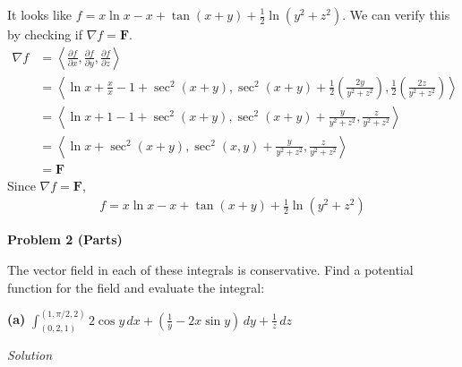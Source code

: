\documentclass{article}
\newcommand{\lrp}[1]{\left( #1 \right)}
\newcommand{\lra}[1]{\left\langle #1 \right\rangle}
\newcommand{\F}[0]{\mathbf{F}}
\newcommand{\Solution}{\textit{Solution}}
\begin{document}
It looks like $f= x\ln x - x+\tan (x+y) + \frac{1}{2}\ln \left(y^2+z^2\right)$. We can verify this by checking if $\nabla f=\F$.
\begin{align*}
    \nabla f &=\lra{\frac{\partial f}{\partial x}, \frac{\partial f}{\partial y}, \frac{\partial f}{\partial z}}\\
    &=\lra{\ln x + \frac{x}{x}-1 + \sec^2 (x+y), \sec^2(x+y) +\frac{1}{2}\lrp{\frac{2y}{y^2+z^2}}, \frac{1}{2}\lrp{\frac{2z}{y^2+z^2}}}\\
    &=\lra{\ln x + 1 -1+\sec^2\lrp{x+y}, \sec^2(x+y)+\frac{y}{y^2+z^2},\frac{z}{y^2+z^2}}\\
    &=\lra{\ln x+\sec^2(x+y),\sec^2(x,y)+\frac{y}{y^2+z^2},\frac{z}{y^2+z^2}}\\
    &=\F
\end{align*}
Since $\nabla f = \F$,
\begin{align*}
    \boxed{f = x\ln x - x+\tan (x+y) + \frac{1}{2}\ln \left(y^2+z^2\right)}
\end{align*}
\newpage
{}
{}\textbf{Problem 2 (Parts)}

The vector field in each of these integrals is conservative. Find a potential function for
the field and evaluate the integral:

{}\textbf{(a)} $\displaystyle \int_{(0,2,1)}^{(1,\pi/2,2)} 2\cos y\,dx+\lrp{\frac{1}{y}-2x\sin y}\,dy+\frac{1}{z}\,dz$

\Solution
\end{document}
